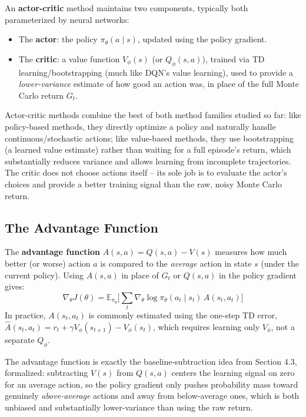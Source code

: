 \documentclass[12pt,a4paper]{article}
\begin{document}
\begin{defbox}
An \textbf{actor-critic} method maintains two components, typically both parameterized by neural networks:
\begin{itemize}[leftmargin=1.5em]
    \item The \textbf{actor}: the policy $\pi_\theta(a\mid s)$, updated using the policy gradient.
    \item The \textbf{critic}: a value function $V_\phi(s)$ (or $Q_\phi(s,a)$), trained via TD learning/bootstrapping (much like DQN's value learning), used to provide a \emph{lower-variance} estimate of how good an action was, in place of the full Monte Carlo return $G_t$.
\end{itemize}
\end{defbox}

\begin{keyidea}
Actor-critic methods combine the best of both method families studied so far: like policy-based methods, they directly optimize a policy and naturally handle continuous/stochastic actions; like value-based methods, they use bootstrapping (a learned value estimate) rather than waiting for a full episode's return, which substantially reduces variance and allows learning from incomplete trajectories. The critic does not choose actions itself -- its sole job is to evaluate the actor's choices and provide a better training signal than the raw, noisy Monte Carlo return.
\end{keyidea}

\subsection{The Advantage Function}

\begin{defbox}
The \textbf{advantage function} $A(s,a) = Q(s,a) - V(s)$ measures how much better (or worse) action $a$ is compared to the \emph{average} action in state $s$ (under the current policy). Using $A(s,a)$ in place of $G_t$ or $Q(s,a)$ in the policy gradient gives:
\[
\nabla_\theta J(\theta) = \mathbb{E}_{\pi_\theta}\Big[\sum_t \nabla_\theta \log\pi_\theta(a_t\mid s_t)\, A(s_t,a_t)\Big]
\]
In practice, $A(s_t,a_t)$ is commonly estimated using the one-step TD error, $\hat A(s_t,a_t) = r_t + \gamma V_\phi(s_{t+1}) - V_\phi(s_t)$, which requires learning only $V_\phi$, not a separate $Q_\phi$.
\end{defbox}

\begin{keyidea}
The advantage function is exactly the baseline-subtraction idea from Section 4.3, formalized: subtracting $V(s)$ from $Q(s,a)$ centers the learning signal on zero for an average action, so the policy gradient only pushes probability mass toward genuinely \emph{above-average} actions and away from below-average ones, which is both unbiased and substantially lower-variance than using the raw return.
\end{keyidea}
\end{document}
